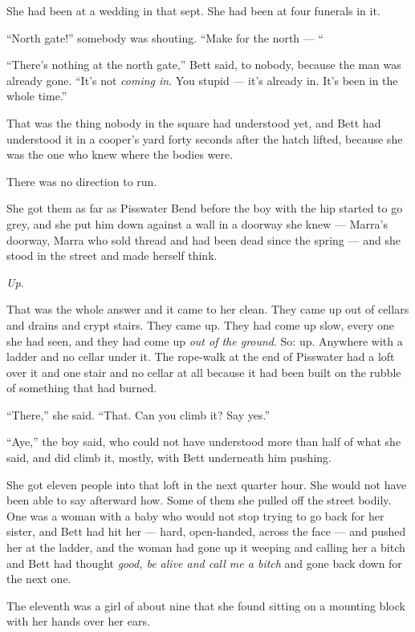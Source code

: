 She had been at a wedding in that sept. She had been at four funerals in it.

“North gate!” somebody was shouting. “Make for the north — “

“There’s nothing at the north gate,” Bett said, to nobody, because the man was already gone. “It’s not \textit{coming in}. You stupid — it’s already in. It’s been in the whole time.”

That was the thing nobody in the square had understood yet, and Bett had understood it in a cooper’s yard forty seconds after the hatch lifted, because she was the one who knew where the bodies were.

There was no direction to run.

\sceneBreak

She got them as far as Pisswater Bend before the boy with the hip started to go grey, and she put him down against a wall in a doorway she knew — Marra’s doorway, Marra who sold thread and had been dead since the spring — and she stood in the street and made herself think.

\textit{Up.}

That was the whole answer and it came to her clean. They came up out of cellars and drains and crypt stairs. They came up. They had come up slow, every one she had seen, and they had come up \textit{out of the ground}. So: up. Anywhere with a ladder and no cellar under it. The rope-walk at the end of Pisswater had a loft over it and one stair and no cellar at all because it had been built on the rubble of something that had burned.

“There,” she said. “That. Can you climb it? Say yes.”

“Aye,” the boy said, who could not have understood more than half of what she said, and did climb it, mostly, with Bett underneath him pushing.

She got eleven people into that loft in the next quarter hour. She would not have been able to say afterward how. Some of them she pulled off the street bodily. One was a woman with a baby who would not stop trying to go back for her sister, and Bett had hit her — hard, open-handed, across the face — and pushed her at the ladder, and the woman had gone up it weeping and calling her a bitch and Bett had thought \textit{good, be alive and call me a bitch} and gone back down for the next one.

The eleventh was a girl of about nine that she found sitting on a mounting block with her hands over her ears.

